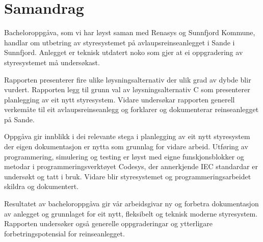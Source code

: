 \chapter{Samandrag}
\thispagestyle{romanpages}

Bacheloroppgåva, som vi har løyst saman med \gls{Renasys} og \gls{Sunnfjord Kommune}, handlar om utbetring av styresystemet på 
avlaupsreinseanlegget i Sande i Sunnfjord. 
Anlegget er teknisk utdatert noko som gjer at ei oppgradering av styresystemet må undersøkast.

Rapporten presenterer fire ulike løysningsalternativ
der ulik grad av dybde blir vurdert. \newline
Rapporten legg til grunn val av løysningsalternativ C som presenterer planlegging av eit nytt styresystem.
Vidare undersøkar rapporten generell verkemåte til eit avlaupsreinseanlegg og forklarer og dokumenterar reinseanlegget på Sande.

Oppgåva gir innblikk i dei relevante stega i planlegging av eit nytt styresystem der eigen dokumentasjon er nytta som grunnlag for vidare arbeid. 
Utføring av programmering, simulering og testing er løyst med eigne funskjonsblokker og metodar i programmeringsverktøyet \gls{Codesys},
der annerkjende \gls{IEC} standardar er undersøkt og tatt i bruk.
Vidare blir styresystemet og programmeringsarbeidet skildra og dokumentert.

Resultatet av bacheloroppgåva gir vår arbeidsgivar ny og forbetra dokumentasjon av anlegget 
og grunnlaget for eit nytt, fleksibelt og teknisk moderne styresystem. 
Rapporten undersøker også generelle oppgraderingar og ytterligare forbetringspotensial for reinseanlegget.